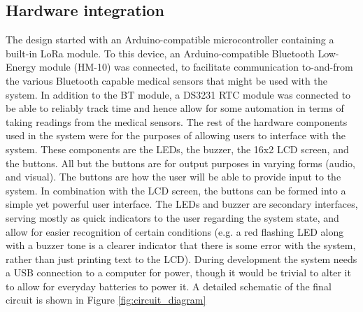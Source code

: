 \subsection{Hardware integration}
The design started with an Arduino-compatible microcontroller containing a built-in LoRa module. To this device, an Arduino-compatible Bluetooth Low-Energy module (HM-10) was connected, to facilitate communication to-and-from the various Bluetooth capable medical sensors that might be used with the system. In addition to the BT module, a DS3231 RTC module was connected to be able to reliably track time and hence allow for some automation in terms of taking readings from the medical sensors. The rest of the hardware components used in the system were for the purposes of allowing users to interface with the system. These components are the LEDs, the buzzer, the 16x2 LCD screen, and the buttons. All but the buttons are for output purposes in varying forms (audio, and visual). The buttons are how the user will be able to provide input to the system. In combination with the LCD screen, the buttons can be formed into a simple yet powerful user interface. The LEDs and buzzer are secondary interfaces, serving mostly as quick indicators to the user regarding the system state, and allow for easier recognition of certain conditions (e.g. a red flashing LED along with a buzzer tone is a clearer indicator that there is some error with the system, rather than just printing text to the LCD). During development the system needs a USB connection to a computer for power, though it would be trivial to alter it to allow for everyday batteries to power it. A detailed schematic of the final circuit is shown in Figure \ref{fig:circuit_diagram}

